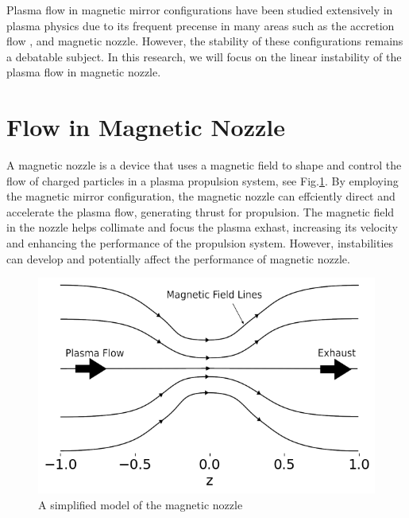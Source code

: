 Plasma flow in magnetic mirror configurations have been studied extensively in plasma physics due to its frequent precense in many areas such as the accretion flow \cite{jockers_stability_1968,aikawa_stability_1979}, and magnetic nozzle\cite{smolyakov_quasineutral_2021}. However, the stability of these configurations remains a debatable subject. In this research, we will focus on the linear instability of the plasma flow in magnetic nozzle.

\section{Flow in Magnetic Nozzle}
A magnetic nozzle is a device that uses a magnetic field to shape and control the flow of charged particles in a plasma propulsion system, see Fig.\ref{fig:magnetic-nozzle}. By employing the magnetic mirror configuration, the magnetic nozzle can effciently direct and accelerate the plasma flow, generating thrust for propulsion. The magnetic field in the nozzle helps collimate and focus the plasma exhast, increasing its velocity and enhancing the performance of the propulsion system. However, instabilities can develop and potentially affect the performance of magnetic nozzle. \cite{kaganovich_2020_physics}

\begin{figure}[htbp]
  \centering
  \includegraphics[width=0.7\linewidth]{figures/magnetic-nozzle}
  \caption{A simplified model of the magnetic nozzle}
  \label{fig:magnetic-nozzle}
\end{figure}

